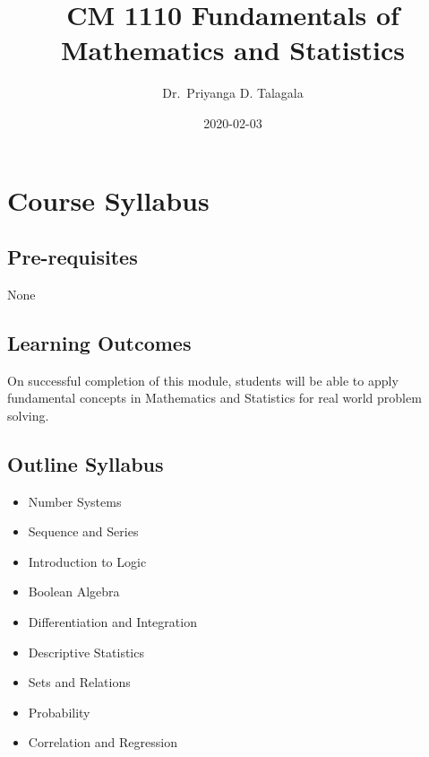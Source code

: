 \documentclass[]{book}
\title{CM 1110 Fundamentals of Mathematics and Statistics}
\author{Dr.~Priyanga D. Talagala}
\date{2020-02-03}
\providecommand{\tightlist}{%
  \setlength{\itemsep}{0pt}\setlength{\parskip}{0pt}}
\begin{document}
\maketitle

{
\setcounter{tocdepth}{1}
\tableofcontents
}
\hypertarget{course-syllabus}{%
\chapter*{Course Syllabus}\label{course-syllabus}}

\hypertarget{pre-requisites}{%
\section*{Pre-requisites}\label{pre-requisites}}

None

\hypertarget{learning-outcomes}{%
\section*{Learning Outcomes}\label{learning-outcomes}}

On successful completion of this module, students will be able to apply fundamental concepts in Mathematics and Statistics for real world problem solving.

\hypertarget{outline-syllabus}{%
\section*{Outline Syllabus}\label{outline-syllabus}}

\begin{itemize}
\tightlist
\item
  Number Systems
\item
  Sequence and Series
\item
  Introduction to Logic
\item
  Boolean Algebra
\item
  Differentiation and Integration
\item
  Descriptive Statistics
\item
  Sets and Relations
\item
  Probability
\item
  Correlation and Regression
\end{itemize}
\end{document}
